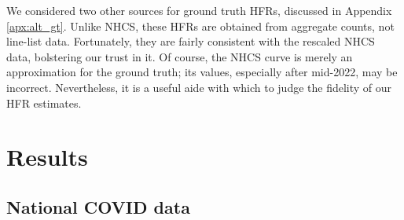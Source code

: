 \documentclass{article}
\begin{document}


We considered two other sources for ground truth HFRs, discussed in Appendix \ref{apx:alt_gt}. Unlike NHCS, these HFRs are obtained from aggregate counts, not line-list data. Fortunately, they are fairly consistent with the rescaled NHCS data, bolstering our trust in it. Of course, the NHCS curve is merely an approximation for the ground truth; its values, especially after mid-2022, may be incorrect. Nevertheless, it is a useful aide with which to judge the fidelity of our HFR estimates.

\section{Results}\label{sec:results}

\subsection{National COVID data}\label{sec:results_real}

\end{document}
